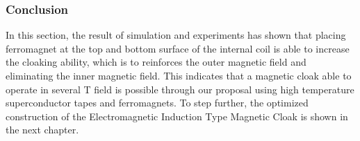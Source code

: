 \subsubsection{Conclusion}
In this section, the result of simulation and experiments has shown that placing ferromagnet at the top and bottom surface of the internal coil is able to increase the cloaking ability,
which is to reinforces the outer magnetic field and eliminating the inner magnetic field.
This indicates that a magnetic cloak able to operate in several T field is possible through our proposal using high temperature superconductor tapes and ferromagnets.
To step further,
the optimized construction of the Electromagnetic Induction Type Magnetic Cloak is shown in the next chapter.
